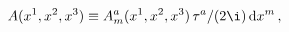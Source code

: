 \begin{equation}
A(x^1,x^2,x^3) \equiv A_m^a (x^1,x^2,x^3)\,\tau^a / (2\i)\, {\rm d}x^m \,,
\end{equation}

